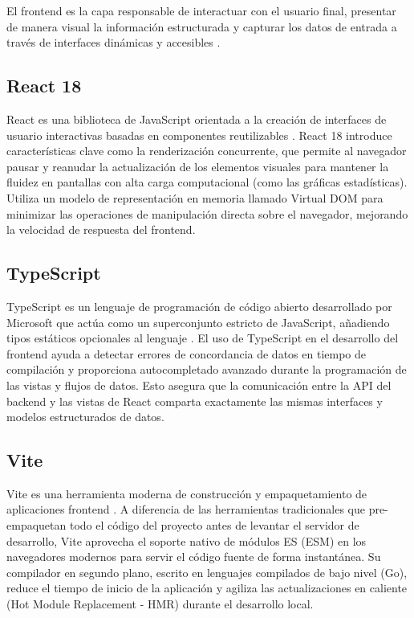 El frontend es la capa responsable de interactuar con el usuario final, presentar de manera visual la información estructurada y capturar los datos de entrada a través de interfaces dinámicas y accesibles \cite{sommerville2016, react2024}.

\subsection{React 18}
React es una biblioteca de JavaScript orientada a la creación de interfaces de usuario interactivas basadas en componentes reutilizables \cite{react2024}. React 18 introduce características clave como la renderización concurrente, que permite al navegador pausar y reanudar la actualización de los elementos visuales para mantener la fluidez en pantallas con alta carga computacional (como las gráficas estadísticas). Utiliza un modelo de representación en memoria llamado Virtual DOM para minimizar las operaciones de manipulación directa sobre el navegador, mejorando la velocidad de respuesta del frontend.

\subsection{TypeScript}
TypeScript es un lenguaje de programación de código abierto desarrollado por Microsoft que actúa como un superconjunto estricto de JavaScript, añadiendo tipos estáticos opcionales al lenguaje \cite{bierman2014}. El uso de TypeScript en el desarrollo del frontend ayuda a detectar errores de concordancia de datos en tiempo de compilación y proporciona autocompletado avanzado durante la programación de las vistas y flujos de datos. Esto asegura que la comunicación entre la API del backend y las vistas de React comparta exactamente las mismas interfaces y modelos estructurados de datos.

\subsection{Vite}
Vite es una herramienta moderna de construcción y empaquetamiento de aplicaciones frontend \cite{you2024}. A diferencia de las herramientas tradicionales que pre-empaquetan todo el código del proyecto antes de levantar el servidor de desarrollo, Vite aprovecha el soporte nativo de módulos ES (ESM) en los navegadores modernos para servir el código fuente de forma instantánea. Su compilador en segundo plano, escrito en lenguajes compilados de bajo nivel (Go), reduce el tiempo de inicio de la aplicación y agiliza las actualizaciones en caliente (Hot Module Replacement - HMR) durante el desarrollo local.

